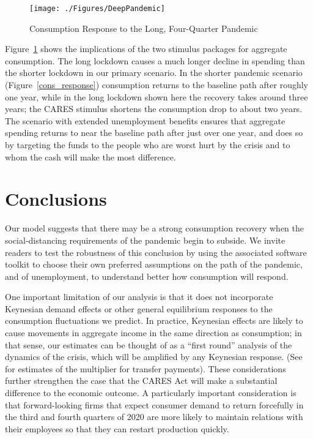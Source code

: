 \documentclass[titlepage,a4paper]{\econtex}
\begin{document}
\begin{figure}
  \centering
  \caption{Consumption Response to the Long, Four-Quarter Pandemic}
  \label{cons_response_pandemic}
  { \texttt{[image: ./Figures/DeepPandemic]}}
\end{figure}

Figure~\ref{cons_response_pandemic} shows the implications of the two stimulus packages for aggregate consumption.
The long lockdown causes a much longer decline in spending than the shorter lockdown in our primary scenario. In the shorter pandemic scenario (Figure~\ref{cons_response}) consumption returns to the baseline path after roughly one year, while in the long lockdown shown here the recovery takes around three years;
the CARES stimulus shortens the consumption drop to about two years.
The scenario with extended unemployment benefits ensures that aggregate spending returns to near the baseline path after just over one year, and does so by targeting the funds to the people who are worst hurt by the crisis and to whom the cash will make the most difference.

\section{Conclusions}

Our model suggests that there may be a strong consumption recovery when the social-distancing requirements of the pandemic begin to subside.
We invite readers to test the robustness of this conclusion by using the associated software toolkit to choose their own preferred assumptions on the path of the pandemic, and of unemployment, to understand better how consumption will respond.

One important limitation of our analysis is that it does not incorporate Keynesian demand effects or other general equilibrium responses to the consumption fluctuations we predict.
In practice, Keynesian effects are likely to cause movements in aggregate income in the same direction as consumption; in that sense, our estimates can be thought of as a ``first round'' analysis of the dynamics of the crisis, which will be amplified by any Keynesian response.  (See \cite{bayer_corona} for estimates of the multiplier for transfer payments).
These considerations further strengthen the case that the CARES Act will make a substantial difference to the economic outcome.
A particularly important consideration is that forward-looking firms that expect consumer demand to return forcefully in the third and fourth quarters of 2020 are more likely to maintain relations with their employees so that they can restart production quickly.
\end{document}
